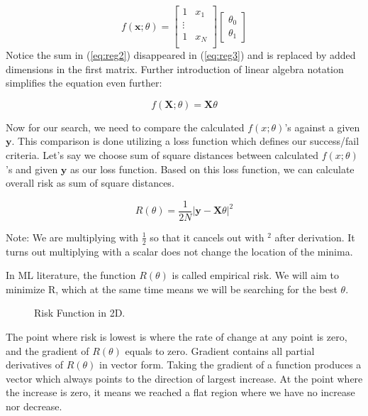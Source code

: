 \documentclass{ecctd01} %
\begin{document}
 \begin{equation}
  \label{eq:reg3}
  f(\mathbf{x};\theta) = 
  \left[ \begin{array}{cc}
      1 & x_{1} \\
      \vdots \\
      1 & x_{N} \\      
  \end{array} \right]
  \left[ \begin{array}{c}
      \theta_{0} \\
      \theta_{1}
  \end{array} \right]
\end{equation}
Notice the sum in (\ref{eq:reg2}) disappeared in (\ref{eq:reg3}) and
is replaced by added dimensions in the first matrix. Further introduction
of linear algebra notation simplifies the equation even further: 

\begin{equation}
  \label{eq:reg4}
  f(\mathbf{X};\theta) = \mathbf{X}\theta
\end{equation}

Now for our search, we need to compare the calculated $f(x;\theta)$'s
against a given $\mathbf{y}$. This comparison is done utilizing a loss
function which defines our success/fail criteria. Let's say we choose
sum of square distances between calculated $f(x;\theta)$'s and given
$\mathbf{y}$ as our loss function. Based on this loss function, we can
calculate overall risk as sum of square distances.

\begin{equation}
  \label{eq:reg5}
  R(\theta) = \frac{1}{2N}|\mathbf{y} - \mathbf{X}\theta|^2
\end{equation}

Note: We are multiplying with $\frac{1}{2}$ so that it cancels out
with $^2$ after derivation. It turns out multiplying with a scalar
does not change the location of the minima.

In ML literature, the function $R(\theta)$ is called empirical
risk. We will aim to minimize R, which at the same time means we will  
be searching for the best $\theta$. 

\begin{figure}[htpb]
  \vspace{3.0cm}  
  \caption{\label{risk} Risk Function in 2D.}
\end{figure}

The point where risk is lowest is where the rate of change at any
point is zero, and the gradient of $R(\theta)$ equals to
zero. Gradient contains all partial derivatives of $R(\theta)$ in
vector form. Taking the gradient of a function produces a vector
which always points to the direction of largest increase. At 
the point where the increase is zero, it means we reached a flat
region where we have no increase nor decrease.
\end{document}
